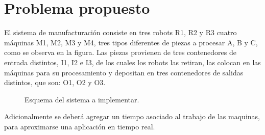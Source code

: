 \documentclass[10pt, a4paper,notitlepage]{article}
\begin{document}
\section{Problema propuesto}
El sistema de manufacturación consiste en tres robots R1, R2 y R3 cuatro máquinas M1, M2, M3 y M4, tres tipos diferentes de piezas a procesar A, B y C, como se observa en la figura.
Las piezas provienen de tres contenedores de entrada distintos, I1, I2 e I3, de los cuales los robots las retiran, las colocan en las máquinas para su procesamiento y depositan en tres contenedores de salidas distintos, que son: O1, O2 y O3.

\begin{figure}[H] %
	\caption{Esquema del sistema a implementar.}
	\label{fig:I1}
\end{figure}

Adicionalmente se deberá agregar un tiempo asociado al trabajo de las maquinas, para aproximarse una aplicación en tiempo real.
\end{document}
